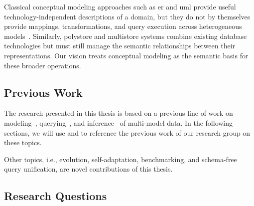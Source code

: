 Classical conceptual modeling approaches such as \acrshort{er} and \acrshort{uml} provide useful technology-independent descriptions of a domain, but they do not by themselves provide mappings, transformations, and query execution across heterogeneous models~\citep{ER, UML}. Similarly, polystore and multistore systems combine existing database technologies but must still manage the semantic relationships between their representations. Our vision treats conceptual modeling as the semantic basis for these broader operations.

\subsection{Previous Work}
\label{sec:previous-work}

The research presented in this thesis is based on a previous line of work on modeling~\citep{mm_cat, mm_cat_journal}, querying~\citep{mm_quecat, koupil2023universal}, and inference~\citep{mm_infer, koupil2022mminfer} of multi-model data. In the following sections, we will use  and  to reference the previous work of our research group on these topics.

Other topics, i.e., evolution, self-adaptation, benchmarking, and schema-free query unification, are novel contributions of this thesis.

\subsection{Research Questions}

